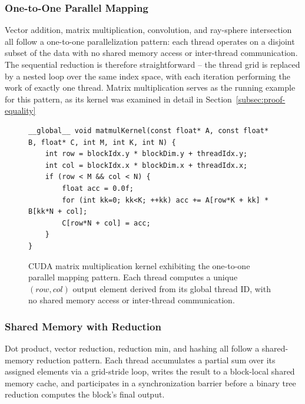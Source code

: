\documentclass{article}
\begin{document}
\subsubsection{One-to-One Parallel Mapping}

Vector addition, matrix multiplication, convolution, and ray-sphere intersection all follow a one-to-one parallelization pattern: each thread operates on a disjoint subset of the data with no shared memory access or inter-thread communication. The sequential reduction is therefore straightforward -- the thread grid is replaced by a nested loop over the same index space, with each iteration performing the work of exactly one thread. Matrix multiplication serves as the running example for this pattern, as its kernel was examined in detail in Section~\ref{subsec:proof-equality}

\begin{figure}[H]
\begin{verbatim}
__global__ void matmulKernel(const float* A, const float* B, float* C, int M, int K, int N) {
    int row = blockIdx.y * blockDim.y + threadIdx.y;
    int col = blockIdx.x * blockDim.x + threadIdx.x;
    if (row < M && col < N) {
        float acc = 0.0f;
        for (int kk=0; kk<K; ++kk) acc += A[row*K + kk] * B[kk*N + col];
        C[row*N + col] = acc;
    }
}
\end{verbatim}
\caption{CUDA matrix multiplication kernel exhibiting the one-to-one parallel mapping pattern. Each thread computes a unique $(row, col)$ output element derived from its global thread ID, with no shared memory access or inter-thread communication.}
\label{fig:matmul-kernel}
\end{figure}

\subsubsection{Shared Memory with Reduction}

Dot product, vector reduction, reduction min, and hashing all follow a shared-memory reduction pattern. Each thread accumulates a partial sum over its assigned elements via a grid-stride loop, writes the result to a block-local shared memory cache, and participates in a synchronization barrier before a binary tree reduction computes the block's final output.
\end{document}
